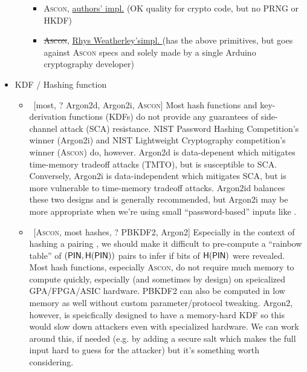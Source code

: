 \begin{itemize}
\begin{itemize}
        \begin{itemize}
            \item A\textsc{scon}, \href{https://github.com/ascon/ascon-c}{authors' impl.} (OK quality for crypto code, but no PRNG or HKDF)
            \item \st{A\textsc{scon}}, \href{https://github.com/rweather/ascon-suite}{Rhys Weatherley'simpl. } (has the above primitives, but goes against A\textsc{scon} specs and solely made by a single Arduino cryptography developer)
        \end{itemize}
    \end{itemize}
    \item KDF / Hashing function
    \begin{itemize}
        \item\ [\xmark most, ? Argon2d, \cmark Argon2i, \cmark\cmark\cmark A\textsc{scon}] Most hash functions and key-derivation functions (KDFs) do not provide any guarantees of side-channel attack (SCA) resistance. NIST Password Hashing Competition's winner (Argon2i) and NIST Lightweight Cryptography competition's winner (A\textsc{scon}) do, however. Argon2d is data-depenent which mitigates time-memory tradeoff attacks (TMTO), but is susceptible to SCA. Conversely, Argon2i is data-independent which mitigates SCA, but is more vulnerable to time-memory tradeoff attacks. Argon2id balances these two designs and is generally recommended, but Argon2i may be more appropriate when we're using small ``password-based'' inputs like \pin.
        \item\ [\xmark\xmark\xmark A\textsc{scon}, \xmark most hashes, ? PBKDF2, \cmark Argon2] Especially in the context of hashing a pairing \pin, we should make it difficult to pre-compute a ``rainbow table'' of $(\mathsf{PIN}, \mathsf{H}(\mathsf{PIN}))$ pairs to infer \pin if bits of $\mathsf{H}(\mathsf{PIN})$ were revealed. Most hash functions, especially A\textsc{scon}, do not require much memory to compute quickly, especially (and sometimes by design) on speicalized GPA/FPGA/ASIC hardware. PBKDF2 can also be computed in low memory as well without custom parameter/protocol tweaking. Argon2, however, is speicfically designed to have a memory-hard KDF so this would slow down attackers even with specialized hardware. We can work around this, if needed (e.g. by adding a secure salt which makes the full input hard to guess for the attacker) but it's something worth considering.

\end{itemize}
\end{itemize}

